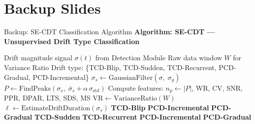 \documentclass[aspectratio=169,10pt]{beamer}
\begin{document}
\appendix
\section*{Backup Slides}

\begin{frame}{Backup: SE-CDT Classification Algorithm}
	\textbf{Algorithm: SE-CDT --- Unsupervised Drift Type Classification}
	\vspace{0.5em}
	\begin{algorithmic}[1]
	    \scriptsize
		\REQUIRE Drift magnitude signal $\sigma(t)$ from Detection Module
		\REQUIRE Raw data window $W$ for Variance Ratio
		\ENSURE Drift type: \{TCD-Blip, TCD-Sudden, TCD-Recurrent, PCD-Gradual, PCD-Incremental\}
		\STATE $\sigma_s \leftarrow \text{GaussianFilter}(\sigma,\; \sigma_g)$
		\STATE $P \leftarrow \text{FindPeaks}(\sigma_s,\; \bar{\sigma}_s + \alpha\,\sigma_{\mathrm{std}})$
		\STATE Compute features: $n_p \leftarrow |P|$, WR, CV, SNR, PPR, DPAR, LTS, SDS, MS
		\STATE $\mathrm{VR} \leftarrow \text{VarianceRatio}(W)$
		\STATE $\ell \leftarrow \text{EstimateDriftDuration}(\sigma_s)$
			\RETURN \textbf{TCD-Blip}
		\ENDIF
		\IF{$\ell > \tau_{\ell}$} 
				\RETURN \textbf{PCD-Incremental}
			\ELSE
				\RETURN \textbf{PCD-Gradual}
			\ENDIF
		\ENDIF
			\RETURN \textbf{TCD-Sudden}
		\ENDIF
			\RETURN \textbf{TCD-Recurrent}
		\ENDIF
			\RETURN \textbf{PCD-Incremental}
		\ELSE
			\RETURN \textbf{PCD-Gradual}
		\ENDIF
	\end{algorithmic}
\end{frame}
\end{document}
